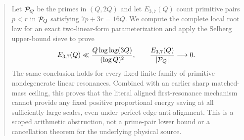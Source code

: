\begin{abstract}
Let $\PP_Q$ be the primes in $(Q,2Q)$ and let $E_{3,7}(Q)$ count primitive pairs
$p<r$ in $\PP_Q$ satisfying $7p+3r=16Q$.  We compute the complete local root law
for an exact two-linear-form parameterization and apply the Selberg upper-bound sieve
to prove
\[
 E_{3,7}(Q)\ll \frac{Q\log\log(3Q)}{(\log Q)^2},
 \qquad \frac{E_{3,7}(Q)}{|\PP_Q|}\longrightarrow0.
\]
The same conclusion holds for every fixed finite family of primitive nondegenerate
linear resonances.  Combined with an earlier sharp matched-mass ceiling, this proves
that the literal aligned first-resonance mechanism cannot provide any fixed positive
proportional energy saving at all sufficiently large scales, even under perfect edge
anti-alignment.  This is a scoped arithmetic obstruction, not a prime-pair lower bound
or a cancellation theorem for the underlying physical source.
\end{abstract}

